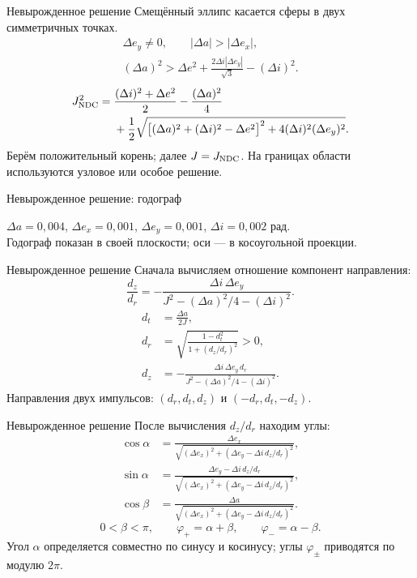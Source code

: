 \documentclass[11pt,aspectratio=169,t]{beamer}
\newcommand{\figcaption}[1]{{\usebeamerfont{caption}\color{coursemuted}#1\par}}
\newcommand{\derivationmathspacing}{%
  \setlength{\abovedisplayskip}{2pt}%
  \setlength{\belowdisplayskip}{3pt}%
  \setlength{\abovedisplayshortskip}{2pt}%
  \setlength{\belowdisplayshortskip}{2pt}%
  \setlength{\jot}{2pt}}
\begin{document}
\begin{frame}{Невырожденное решение}
\relax
\derivationmathspacing
Смещённый эллипс касается сферы в двух симметричных точках.
\[
\begin{gathered}
\Delta e_y\ne0,\qquad |\Delta a|>|\Delta e_x|,\\
(\Delta a)^2>\Delta e^2+
\frac{2\Delta i|\Delta e_y|}{\sqrt3}-(\Delta i)^2.
\end{gathered}
\]
\[
\begin{aligned}
J_{\rm NDC}^2={}&\frac{(\Delta i)^2+\Delta e^2}{2}
-\frac{(\Delta a)^2}{4}\\
&+\frac12\sqrt{
\bigl[(\Delta a)^2+(\Delta i)^2-\Delta e^2\bigr]^2
+4(\Delta i)^2(\Delta e_y)^2}.
\end{aligned}
\]
\medskip
Берём положительный корень; далее $J=J_{\rm NDC}$.
На границах области используются узловое или особое решение.
\end{frame}

\begin{frame}{Невырожденное решение: годограф}
\relax
\centering

\par
\figcaption{$\Delta a=0{,}004$, $\Delta e_x=0{,}001$, $\Delta e_y=0{,}001$, $\Delta i=0{,}002$ рад.\\
Годограф показан в своей плоскости; оси --- в косоугольной проекции.}
\end{frame}

\begin{frame}{Невырожденное решение}
\relax
\derivationmathspacing
Сначала вычисляем отношение компонент направления:
\[
\frac{d_z}{d_r}=-\frac{\Delta i\,\Delta e_y}
{J^2-(\Delta a)^2/4-(\Delta i)^2}.
\]
\[
\begin{aligned}
d_t&=\frac{\Delta a}{2J},\\
d_r&=\sqrt{\frac{1-d_t^2}{1+(d_z/d_r)^2}}>0,\\
d_z&=-\frac{\Delta i\,\Delta e_y\,d_r}
{J^2-(\Delta a)^2/4-(\Delta i)^2}.
\end{aligned}
\]
\medskip
Направления двух импульсов:
$(d_r,d_t,d_z)$ и $(-d_r,d_t,-d_z)$.
\end{frame}

\begin{frame}{Невырожденное решение}
\relax
\derivationmathspacing
После вычисления $d_z/d_r$ находим углы:
\[
\begin{aligned}
\cos\alpha&=\frac{\Delta e_x}
{\sqrt{(\Delta e_x)^2+(\Delta e_y-\Delta i\,d_z/d_r)^2}},\\
\sin\alpha&=\frac{\Delta e_y-\Delta i\,d_z/d_r}
{\sqrt{(\Delta e_x)^2+(\Delta e_y-\Delta i\,d_z/d_r)^2}},\\
\cos\beta&=\frac{\Delta a}
{\sqrt{(\Delta e_x)^2+(\Delta e_y-\Delta i\,d_z/d_r)^2}}.
\end{aligned}
\]
\[
0<\beta<\pi,\qquad
\varphi_+=\alpha+\beta,\qquad \varphi_-=\alpha-\beta.
\]
\medskip
Угол $\alpha$ определяется совместно по синусу и косинусу;
углы $\varphi_\pm$ приводятся по модулю $2\pi$.
\end{frame}
\end{document}
